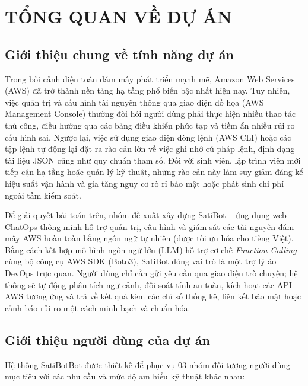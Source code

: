 \documentclass[a4paper,12pt]{article}
\begin{document}

\section{TỔNG QUAN VỀ DỰ ÁN}

\subsection{Giới thiệu chung về tính năng dự án}

Trong bối cảnh điện toán đám mây phát triển mạnh mẽ, Amazon Web Services (AWS) đã trở thành nền tảng hạ tầng phổ biến bậc nhất hiện nay. Tuy nhiên, việc quản trị và cấu hình tài nguyên thông qua giao diện đồ họa (AWS Management Console) thường đòi hỏi người dùng phải thực hiện nhiều thao tác thủ công, điều hướng qua các bảng điều khiển phức tạp và tiềm ẩn nhiều rủi ro cấu hình sai. Ngược lại, việc sử dụng giao diện dòng lệnh (AWS CLI) hoặc các tập lệnh tự động lại đặt ra rào cản lớn về việc ghi nhớ cú pháp lệnh, định dạng tài liệu JSON cũng như quy chuẩn tham số. Đối với sinh viên, lập trình viên mới tiếp cận hạ tầng hoặc quản lý kỹ thuật, những rào cản này làm suy giảm đáng kể hiệu suất vận hành và gia tăng nguy cơ rò rỉ bảo mật hoặc phát sinh chi phí ngoài tầm kiểm soát.

Để giải quyết bài toán trên, nhóm đề xuất xây dựng SatiBot -- ứng dụng web ChatOps thông minh hỗ trợ quản trị, cấu hình và giám sát các tài nguyên đám mây AWS hoàn toàn bằng ngôn ngữ tự nhiên (được tối ưu hóa cho tiếng Việt). Bằng cách kết hợp mô hình ngôn ngữ lớn (LLM) hỗ trợ cơ chế \textit{Function Calling} cùng bộ công cụ AWS SDK (Boto3), SatiBot đóng vai trò là một trợ lý ảo DevOps trực quan. Người dùng chỉ cần gửi yêu cầu qua giao diện trò chuyện; hệ thống sẽ tự động phân tích ngữ cảnh, đối soát tính an toàn, kích hoạt các API AWS tương ứng và trả về kết quả kèm các chỉ số thống kê, liên kết bảo mật hoặc cảnh báo rủi ro một cách minh bạch và chuẩn hóa.

\subsection{Giới thiệu người dùng của dự án}

Hệ thống SatiBotBot được thiết kế để phục vụ 03 nhóm đối tượng người dùng mục tiêu với các nhu cầu và mức độ am hiểu kỹ thuật khác nhau:
\end{document}
